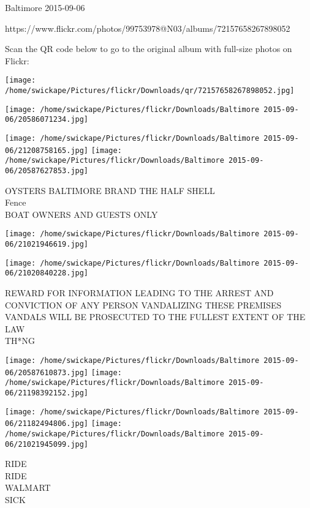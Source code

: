 \documentclass[10pt,letterpaper]{article}
\begin{document}
Baltimore 2015-09-06

https://www.flickr.com/photos/99753978@N03/albums/72157658267898052

Scan the QR code below to go to the original album with full-size photos on Flickr:

\texttt{[image: /home/swickape/Pictures/flickr/Downloads/qr/72157658267898052.jpg]}
\pagebreak

\texttt{[image: /home/swickape/Pictures/flickr/Downloads/Baltimore 2015-09-06/20586071234.jpg]}

\vspace{0.25in}
\texttt{[image: /home/swickape/Pictures/flickr/Downloads/Baltimore 2015-09-06/21208758165.jpg]}
\texttt{[image: /home/swickape/Pictures/flickr/Downloads/Baltimore 2015-09-06/20587627853.jpg]}

OYSTERS BALTIMORE BRAND THE HALF SHELL\\
Fence\\
BOAT OWNERS AND GUESTS ONLY\\
\pagebreak

\texttt{[image: /home/swickape/Pictures/flickr/Downloads/Baltimore 2015-09-06/21021946619.jpg]}

\vspace{0.25in}
\texttt{[image: /home/swickape/Pictures/flickr/Downloads/Baltimore 2015-09-06/21020840228.jpg]}

REWARD FOR INFORMATION LEADING TO THE ARREST AND CONVICTION OF ANY PERSON VANDALIZING THESE PREMISES VANDALS WILL BE PROSECUTED TO THE FULLEST EXTENT OF THE LAW\\
TH*NG\\
\pagebreak

\texttt{[image: /home/swickape/Pictures/flickr/Downloads/Baltimore 2015-09-06/20587610873.jpg]}
\texttt{[image: /home/swickape/Pictures/flickr/Downloads/Baltimore 2015-09-06/21198392152.jpg]}

\texttt{[image: /home/swickape/Pictures/flickr/Downloads/Baltimore 2015-09-06/21182494806.jpg]}
\texttt{[image: /home/swickape/Pictures/flickr/Downloads/Baltimore 2015-09-06/21021945099.jpg]}

RIDE\\
RIDE\\
WALMART\\
SICK\\
\pagebreak
\end{document}
